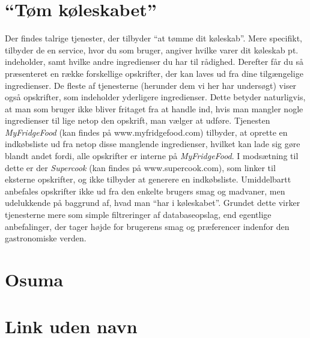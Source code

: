 \section{``Tøm køleskabet''}
Der findes talrige tjenester, der tilbyder “at tømme dit køleskab”. 
Mere specifikt, tilbyder de en service, hvor du som bruger, angiver hvilke varer dit køleskab pt. indeholder, samt hvilke andre ingredienser du har til rådighed. 
Derefter får du så præsenteret en række forskellige opskrifter, der kan laves ud fra dine tilgængelige ingredienser. 
De fleste af tjenesterne (herunder dem vi her har undersøgt) viser også opskrifter, som indeholder yderligere ingredienser. 
Dette betyder naturligvis, at man som bruger ikke bliver fritaget fra at handle ind, hvis man mangler nogle ingredienser til lige netop den opskrift, man vælger at udføre. 
Tjenesten \textit{MyFridgeFood} (kan findes på www.myfridgefood.com) tilbyder, at oprette en indkøbsliste ud fra netop disse manglende ingredienser, hvilket kan lade sig gøre blandt andet fordi, alle opskrifter er interne på \textit{MyFridgeFood}. 
I modsætning til dette er der \textit{Supercook} (kan findes på www.supercook.com), som linker til eksterne opskrifter, og ikke tilbyder at generere en indkøbsliste. 
Umiddelbartt anbefales opskrifter ikke ud fra den enkelte brugers smag og madvaner, men udelukkende på baggrund af, hvad man “har i køleskabet”. 
Grundet dette virker tjenesterne mere som simple filtreringer af databaseopslag, end egentlige anbefalinger, der tager højde for brugerens smag og præferencer indenfor den gastronomiske verden.


\section{Osuma}

\section{Link uden navn}